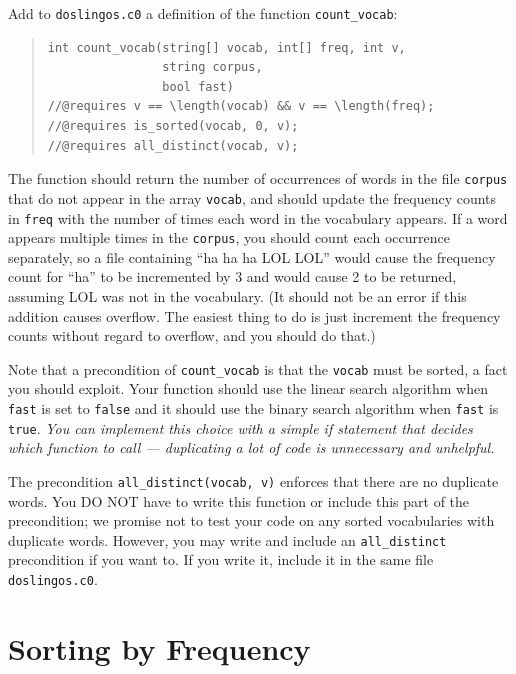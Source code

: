 \documentclass[12pt]{exam}
\begin{document}
\begin{task}[4]
Add to \lstinline'doslingos.c0' a definition of the function
\lstinline'count_vocab':
\begin{quote}
\begin{lstlisting}[numbers=none]
int count_vocab(string[] vocab, int[] freq, int v,
                string corpus,
                bool fast)
//@requires v == \length(vocab) && v == \length(freq);
//@requires is_sorted(vocab, 0, v);
//@requires all_distinct(vocab, v);
\end{lstlisting}
\end{quote}
The function should return the number of occurrences of words in the
file \lstinline"corpus" that do not appear in the array
\lstinline"vocab", and should update the frequency counts in
\lstinline'freq' with the number of times each word in the vocabulary
appears.  If a word appears multiple times in the \lstinline"corpus",
you should count each occurrence separately, so a file containing ``ha
ha ha LOL LOL'' would cause the frequency count for ``ha'' to be
incremented by 3 and would cause 2 to be returned, assuming LOL was
not in the vocabulary. (It should not be an error if this addition
causes overflow. The easiest thing to do is just increment the
frequency counts without regard to overflow, and you should do that.)

Note that a precondition of \lstinline"count_vocab" is that the
\lstinline"vocab" must be sorted, a fact you should exploit.  Your function
should use the linear search algorithm when \lstinline"fast" is set to
\lstinline'false' and it should use the binary search algorithm when \lstinline"fast"
is \lstinline'true'.  {\em You can implement this choice with a simple
  if statement that decides which function to call --- duplicating a
  lot of code is unnecessary and unhelpful.}

The precondition \lstinline'all_distinct(vocab, v)' enforces that there are
no duplicate words. You DO NOT have to write this function or include
this part of the precondition; we promise not to test your code on any
sorted vocabularies with duplicate words. However, you may write and
include an \lstinline'all_distinct' precondition if you want to. If you
write it, include it in the same file \lstinline'doslingos.c0'.

\end{task}


\section{Sorting by Frequency}
\end{document}
